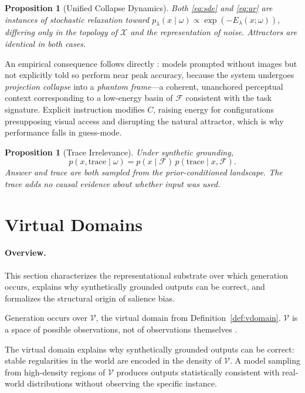 \documentclass[twocolumn,10pt]{article}
\theoremstyle{thmstyle}
\newtheorem{proposition}[theorem]{Proposition}
\theoremstyle{defstyle}
\newcommand{\Xspace}{\mathcal{X}}
\newcommand{\Fprior}{\mathcal{F}}
\newcommand{\Vdomain}{\mathcal{V}}
\begin{document}
\begin{proposition}[Unified Collapse Dynamics]
\label{prop:unified}
Both \eqref{eq:sde} and \eqref{eq:ar} are instances of stochastic
relaxation toward $p_\lambda(x\mid\omega) \propto
\exp(-E_\lambda(x;\omega))$, differing only in the topology of $\Xspace$
and the representation of noise. Attractors are identical in both cases.
\end{proposition}

An empirical consequence follows directly \citep{asadi2026mirage}: models
prompted without images but not explicitly told so perform near peak
accuracy, because the system undergoes \emph{projection collapse} into a
\emph{phantom frame}---a coherent, unanchored perceptual context
corresponding to a low-energy basin of $\Fprior$ consistent with the
task signature. Explicit instruction modifies $C$, raising energy for
configurations presupposing visual access and disrupting the natural
attractor, which is why performance falls in guess-mode.

\begin{proposition}[Trace Irrelevance]
\label{prop:trace}
Under synthetic grounding,
\[
  p(x, \text{trace}\mid\omega)
  = p(x\mid\Fprior)\,p(\text{trace}\mid x, \Fprior).
\]
Answer and trace are both sampled from the prior-conditioned landscape.
The trace adds no causal evidence about whether input was used.
\end{proposition}

\section{Virtual Domains}
\label{sec:vdomain}

\paragraph{Overview.}
This section characterizes the representational substrate over which
generation occurs, explains why synthetically grounded outputs can be
correct, and formalizes the structural origin of salience bias.

Generation occurs over $\Vdomain$, the virtual domain from
Definition~\ref{def:vdomain}. $\Vdomain$ is a space of possible
observations, not of observations themselves \citep{bommasani2021foundation}.

The virtual domain explains why synthetically grounded outputs can be
correct: stable regularities in the world are encoded in the density
of $\Vdomain$. A model sampling from high-density regions of $\Vdomain$
produces outputs statistically consistent with real-world distributions
without observing the specific instance.
\end{document}

